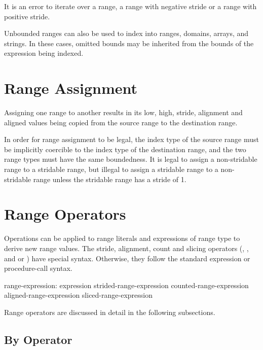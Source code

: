 It is an error to iterate over a  range,
a  range with negative stride or a
 range with positive stride.

Unbounded ranges can also be used to index into ranges, domains,
arrays, and strings.  In these cases, omitted bounds may be inherited
from the bounds of the expression being indexed.


\section{Range Assignment}
\label{Range_Assignment}

Assigning one range to another results in its low, high, stride, alignment and
aligned values being copied from the source range to the destination range.

In order for range assignment to be legal, the index type of the
source range must be implicitly coercible to the index type of the
destination range, and the two range types must have the same boundedness.
It is legal to assign a non-stridable range to a stridable
range, but illegal to assign a stridable range to a non-stridable
range unless the stridable range has a stride of 1.


\section{Range Operators}
\label{Range_Operators}

Operations can be applied to range literals and expressions of range type to
derive new range values.  The stride, alignment, count and slicing
operators (, , \chpl{\#} and \chpl{\(\)} or \chpl{\[\]})
have special syntax.  Otherwise, they follow the standard expression or
procedure-call syntax.
\begin{syntax}
range-expression:
  expression
  strided-range-expression
  counted-range-expression
  aligned-range-expression
  sliced-range-expression
\end{syntax}

Range operators are discussed in detail in the following subsections.

\subsection{By Operator}
\label{By_Operator_For_Ranges}

